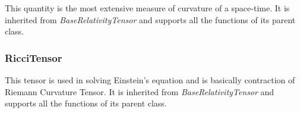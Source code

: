 \documentclass[onecolumn]{aa}
\begin{document}
This quantity is the most extensive measure of curvature of a space-time. It is inherited from \textit{BaseRelativityTensor} and supports all the functions of its parent class. 




\subsubsection{RicciTensor}\label{subsubsec:riccitensor}

This tensor is used in solving Einstein's  equation and is basically contraction of Riemann Curvature Tensor.  It is inherited from \textit{BaseRelativityTensor} and supports all the functions of its parent class. 

\end{document}
